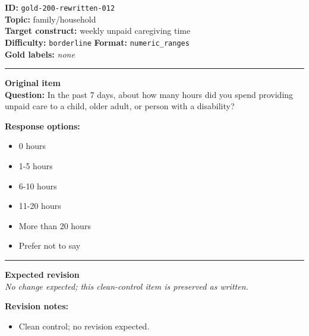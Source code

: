 \documentclass[10pt,a4paper]{article}
\newcommand{\sectionline}{\vspace{0.15em}\hrule\vspace{0.35em}}
\begin{document}
\begin{tcolorbox}[colframe=CleanGreen,colback=white,colbacktitle=CleanGreen!9,coltitle=black,title={Item 012\hfill Clean control}]
\textbf{ID:} \texttt{gold-200-rewritten-012}\\
\textbf{Topic:} family/household\\
\textbf{Target construct:} weekly unpaid caregiving time\\
\textbf{Difficulty:} \texttt{borderline} \quad \textbf{Format:} \texttt{numeric\_ranges}\\
\textbf{Gold labels:} \textit{none}\\
\sectionline
\textbf{Original item}\\
\textbf{Question:} In the past 7 days, about how many hours did you spend providing unpaid care to a child, older adult, or person with a disability?
\par\textbf{Response options:}
\begin{itemize}
\item 0 hours
\item 1-5 hours
\item 6-10 hours
\item 11-20 hours
\item More than 20 hours
\item Prefer not to say
\end{itemize}
\sectionline
\textbf{Expected revision}\\
\textit{No change expected; this clean-control item is preserved as written.}
\par\textbf{Revision notes:}
\begin{itemize}
\item Clean control; no revision expected.
\end{itemize}
\end{tcolorbox}
\end{document}
